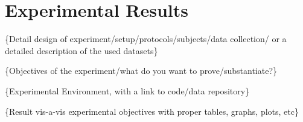 \section{Experimental Results}
\label{sec:results}

\{Detail design of experiment/setup/protocols/subjects/data collection/ or a detailed description of the used datasets\}

\{Objectives of the experiment/what do you want to prove/substantiate?\}

\{Experimental Environment, with a link to code/data repository\}

\{Result vis-a-vis experimental objectives with proper tables, graphs, plots, etc\}


	


